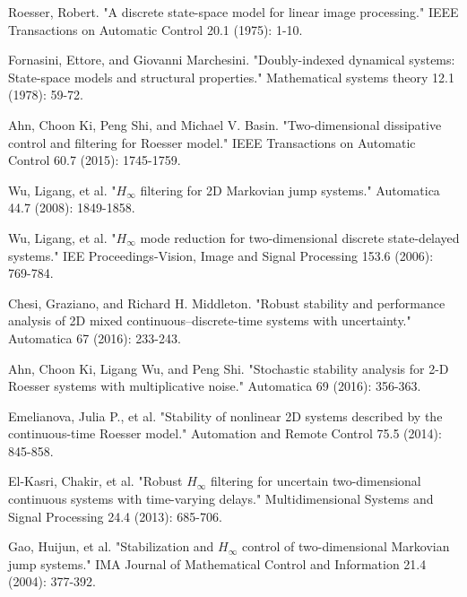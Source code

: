 \documentclass[conference]{IEEEtran}
\begin{document}

%
%


\begin{thebibliography}{1}
	Roesser, Robert. "A discrete state-space model for linear image processing." IEEE Transactions on Automatic Control 20.1 (1975): 1-10.
	
	Fornasini, Ettore, and Giovanni Marchesini. "Doubly-indexed dynamical systems: State-space models and structural properties." Mathematical systems theory 12.1 (1978): 59-72.
	
	Ahn, Choon Ki, Peng Shi, and Michael V. Basin. "Two-dimensional dissipative control and filtering for Roesser model." IEEE Transactions on Automatic Control 60.7 (2015): 1745-1759.
	
	Wu, Ligang, et al. "$H_{\infty}$ filtering for 2D Markovian jump systems." Automatica 44.7 (2008): 1849-1858.
	
	Wu, Ligang, et al. "$H_{\infty}$ mode reduction for two-dimensional discrete state-delayed systems." IEE Proceedings-Vision, Image and Signal Processing 153.6 (2006): 769-784.
	
	Chesi, Graziano, and Richard H. Middleton. "Robust stability and performance analysis of 2D mixed continuous–discrete-time systems with uncertainty." Automatica 67 (2016): 233-243.
	
	Ahn, Choon Ki, Ligang Wu, and Peng Shi. "Stochastic stability analysis for 2-D Roesser systems with multiplicative noise." Automatica 69 (2016): 356-363.
	
	Emelianova, Julia P., et al. "Stability of nonlinear 2D systems described by the continuous-time Roesser model." Automation and Remote Control 75.5 (2014): 845-858.
	
	El-Kasri, Chakir, et al. "Robust $ H_ {\infty} $ filtering for uncertain two-dimensional continuous systems with time-varying delays." Multidimensional Systems and Signal Processing 24.4 (2013): 685-706.
	
	Gao, Huijun, et al. "Stabilization and $H_{\infty}$ control of two-dimensional Markovian jump systems." IMA Journal of Mathematical Control and Information 21.4 (2004): 377-392.
	

\end{thebibliography}
\end{document}
